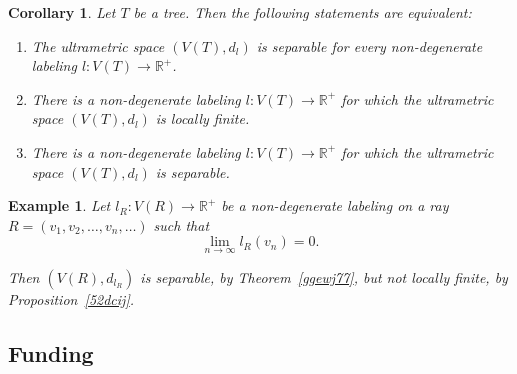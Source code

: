 \documentclass[pdflatex,sn-mathphys-num]{sn-jnl}%
\newtheorem{corollary}{Corollary}%
\theoremstyle{thmstyletwo}%
\newtheorem{example}{Example}%
\begin{document}
\begin{corollary}
 Let $T$ be a tree. Then the following statements are equivalent:

 \begin{enumerate}[label=\textit{(\roman*)}, left=0pt]
\item The ultrametric space $(V(T), d_l)$ is separable for every non-degenerate labeling $l \colon V(T) \to \mathbb{R}^+$.

\item There is a non-degenerate labeling $l \colon V(T) \to \mathbb{R}^+$ for which the ultrametric space $(V(T), d_l)$ is locally finite.


\item There is a non-degenerate labeling $l \colon V(T) \to \mathbb{R}^+$ for which the ultrametric space $(V(T), d_l)$ is separable.

\end{enumerate}

\end{corollary}

\begin{example}
 Let $l_R \colon V(R) \to \mathbb{R}^+$
be a non-degenerate labeling on a ray $R = (v_1, v_2, \ldots, v_n, \ldots)$
such that
\begin{equation*}
\lim_{n \to \infty} l_R(v_n) = 0.
\end{equation*}

Then $(V(R), d_{l_R})$ is separable, by Theorem~\ref{ggewj77}, but not locally finite, by Proposition~\ref{52dcij}.
\end{example}




































\subsection*{Funding}
\end{document}
